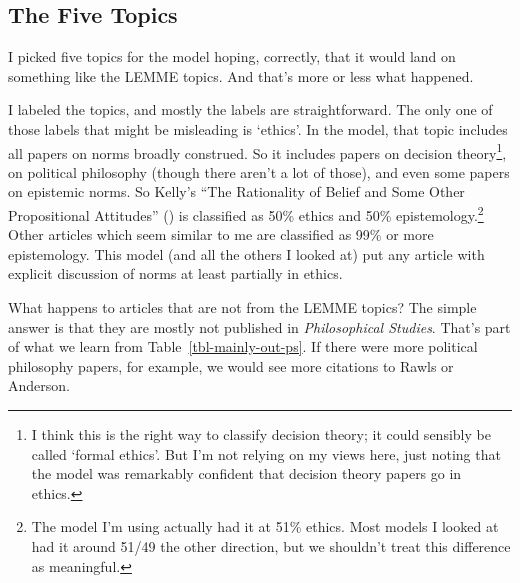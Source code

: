 \documentclass[
  11pt,
  letterpaper,
  DIV=11,
  numbers=noendperiod,
  twoside]{scrartcl}
\begin{document}
\subsection{The Five Topics}\label{sec-five-topics}

I picked five topics for the model hoping, correctly, that it would land
on something like the LEMME topics. And that's more or less what
happened.

I labeled the topics, and mostly the labels are straightforward. The
only one of those labels that might be misleading is `ethics'. In the
model, that topic includes all papers on norms broadly construed. So it
includes papers on decision theory\footnote{I think this is the right
  way to classify decision theory; it could sensibly be called `formal
  ethics'. But I'm not relying on my views here, just noting that the
  model was remarkably confident that decision theory papers go in
  ethics.}, on political philosophy (though there aren't a lot of
those), and even some papers on epistemic norms. So Kelly's ``The
Rationality of Belief and Some Other Propositional Attitudes''
() is classified as 50\%
ethics and 50\% epistemology.\footnote{The model I'm using actually had
  it at 51\% ethics. Most models I looked at had it around 51/49 the
  other direction, but we shouldn't treat this difference as meaningful.}
Other articles which seem similar to me are classified as 99\% or more
epistemology. This model (and all the others I looked at) put any
article with explicit discussion of norms at least partially in ethics.

What happens to articles that are not from the LEMME topics? The simple
answer is that they are mostly not published in \emph{Philosophical
Studies}. That's part of what we learn from
Table~\ref{tbl-mainly-out-ps}. If there were more political philosophy
papers, for example, we would see more citations to Rawls or Anderson.
\end{document}
